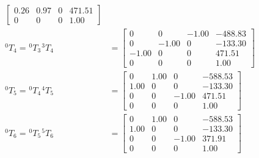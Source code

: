 \begin{equation*}
\begin{split}
\begin{bmatrix}
                                                                          0.26 & 0.97  & 0     & 471.51  \\
                                                                          0    & 0     & 0     & 1.00
                                                                      \end{bmatrix}  \\
        ^{0}T_{4} = \hspace{1pt} ^{0}T_{3} \hspace{1pt} ^{3}T_{4} & = \begin{bmatrix}
                                                                          0     & 0     & -1.00 & -488.83 \\
                                                                          0     & -1.00 & 0     & -133.30 \\
                                                                          -1.00 & 0     & 0     & 471.51  \\
                                                                          0     & 0     & 0     & 1.00
                                                                      \end{bmatrix} \\
        ^{0}T_{5} = \hspace{1pt} ^{0}T_{4} \hspace{1pt} ^{4}T_{5} & = \begin{bmatrix}
                                                                          0    & 1.00 & 0     & -588.53 \\
                                                                          1.00 & 0    & 0     & -133.30 \\
                                                                          0    & 0    & -1.00 & 471.51  \\
                                                                          0    & 0    & 0     & 1.00
                                                                      \end{bmatrix}   \\
        ^{0}T_{6} = \hspace{1pt} ^{0}T_{5} \hspace{1pt} ^{5}T_{6} & = \begin{bmatrix}
                                                                          0    & 1.00 & 0     & -588.53 \\
                                                                          1.00 & 0    & 0     & -133.30 \\
                                                                          0    & 0    & -1.00 & 371.91  \\
                                                                          0    & 0    & 0     & 1.00
                                                                      \end{bmatrix}
    \end{split}
\end{equation*}
